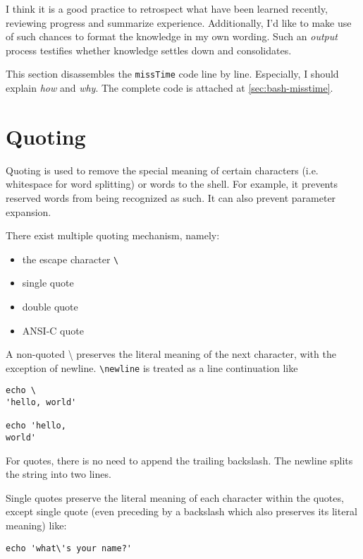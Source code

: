 I think it is a good practice to retrospect what have been learned
recently, reviewing progress and summarize
experience. Additionally, I'd like to make use of such chances to
format the knowledge in my own wording. Such an \textit{output}
process testifies whether knowledge settles down and consolidates.

This section disassembles the \verb|missTime| code line by
line. Especially, I should explain \textit{how} and
\textit{why}. The complete code is attached at
\ref{sec:bash-misstime}.

\section{Quoting}
\label{sec:bash-quoting}

Quoting is used to remove the special meaning of certain
characters (i.e. whitespace for word splitting) or words to the
shell. For example, it prevents reserved words from being
recognized as such. It can also prevent parameter expansion.

There exist multiple quoting mechanism, namely:

\begin{itemize}
\item the escape character \verb|\|
\item single quote
\item double quote
\item ANSI-C quote
\end{itemize}

A non-quoted \textbackslash{} preserves the literal meaning of the
next character, with the exception of newline. \verb|\newline| is
treated as a line continuation like

\begin{lstlisting}
echo \
'hello, world'

echo 'hello,
world'
\end{lstlisting}

For quotes, there is no need to append the trailing backslash. The
newline splits the string into two lines.

Single quotes preserve the literal meaning of each character
within the quotes, except single quote (even preceding by a
backslash which also preserves its literal meaning) like:

\begin{lstlisting}
echo 'what\'s your name?'
\end{lstlisting}

